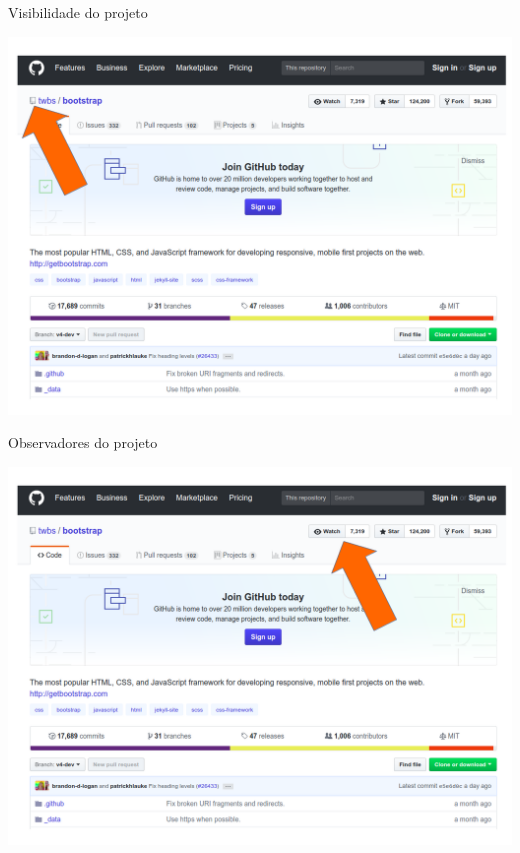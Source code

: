 \documentclass{beamer}
\begin{document}
\begin{frame}{Visibilidade do projeto}
  \begin{center}
       \includegraphics[height=0.7\paperheight]{fig/aula3/visibilidade_projeto.png} \\
      \end{center}
 
\end{frame}
\begin{frame}{Observadores do projeto}
  \begin{center}
       
\includegraphics[height=0.7\paperheight]{fig/aula3/views_projeto.png} \\
      \end{center}
 
\end{frame}
\end{document}
